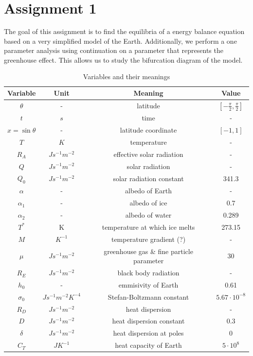 \section{Assignment 1}
The goal of this assignment is to find the equilibria of a energy balance equation based on a very simplified model of the Earth.
Additionally, we perform a one parameter analysis using continuation on a parameter that represents the greenhouse effect. 
This allows us to study the bifurcation diagram of the model.

\begin{table}[H]
    \centering
    \begin{tabular}{|c|c|c|c|}
        \hline
        Variable & Unit &  Meaning & Value\\
        \hline
        $\theta$ & - & latitude & $[-\frac{\pi}{2}, \frac{\pi}{2}]$\\
        $t $ & $s$ & time & -\\
        $x = \sin \theta$ & -  & latitude coordinate & $[-1, 1]$\\
        $T $ & $K$ & temperature & -\\
        $R_A $ & $J s^{-1} m^{-2}$ & effective solar radiation & - \\
        $Q $ & $J s^{-1} m^{-2}$ & solar radiation & -\\
        $Q_0 $ & $J s^{-1} m^{-2}$ & solar radiation constant & 341.3\\
        $\alpha$ & - & albedo of Earth & -\\
        $\alpha_1$ & - & albedo of ice & 0.7\\
        $\alpha_2$ & - & albedo of water & 0.289\\
        $T^{*} $ & K & temperature at which ice melts & 273.15\\
        $M$ & $K^{-1}$ & temperature gradient (?) & -\\
        $\mu $ & $J s^{-1} m^{-2}$ & greenhouse gas \& fine particle parameter & 30\\
        $R_E $ & $J s^{-1} m^{-2}$ & black body radiation & -\\
        $h_0$ & - & emmisivity of Earth & 0.61\\
        $\sigma_0 $ & $J s^{-1} m^{-2} K^{-4}$ & Stefan-Boltzmann constant & $5.67 \cdot 10^{-8}$\\
        $R_D $ & $J s^{-1} m^{-2}$ & heat dispersion & -\\
        $D $ & $J s^{-1} m^{-2}$ & heat dispersion constant & 0.3\\
        $\delta $ & $J s^{-1} m^{-2}$ & heat dispersion at poles & 0\\
        $C_T $ & $J K^{-1}$  & heat capacity of Earth & $5 \cdot 10^{8}$\\
        \hline
    \end{tabular}
    \caption{Variables and their meanings}
    \label{tab:vars}
\end{table}

